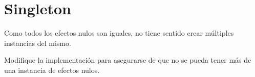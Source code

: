 \section{Singleton}
  \begin{Exercise}[
      title={Instancia única del efecto nulo}, 
      label={ex:singleton-1}, 
      difficulty=1
    ]
    Como todos los efectos nulos son iguales, no tiene sentido crear múltiples instancias 
    del mismo.

    Modifique la implementación para asegurarse de que no se pueda tener más de una 
    instancia de efectos nulos.
  \end{Exercise}
%